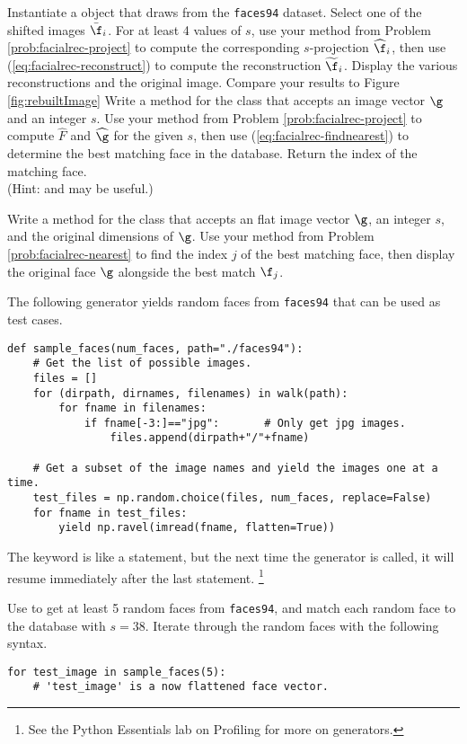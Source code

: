 Instantiate a  object that draws from the \texttt{faces94} dataset.
Select one of the shifted images $\bar{\f}_i$.
For at least 4 values of $s$, use your method from Problem \ref{prob:facialrec-project} to compute the corresponding $s$-projection $\widehat{\f}_i$, then use (\ref{eq:facialrec-reconstruct}) to compute the reconstruction $\widetilde{\f}_i$.
Display the various reconstructions and the original image.
Compare your results to Figure \ref{fig:rebuiltImage}
Write a method for the  class that accepts an image vector $\g$ and an integer $s$.
Use your method from Problem \ref{prob:facialrec-project} to compute $\widehat{F}$ and $\widehat{\g}$ for the given $s$, then use (\ref{eq:facialrec-findnearest}) to determine the best matching face in the database.
Return the index of the matching face.
\\(Hint:  and  may be useful.)
\label{prob:facialrec-nearest}

Write a method for the  class that accepts an flat image vector $\g$, an integer $s$, and the original dimensions of $\g$.
Use your method from Problem \ref{prob:facialrec-nearest} to find the index $j$ of the best matching face, then display the original face $\g$ alongside the best match $\f_j$.

The following generator yields random faces from \texttt{faces94} that can be used as test cases.
%
\begin{lstlisting}
def sample_faces(num_faces, path="./faces94"):
    # Get the list of possible images.
    files = []
    for (dirpath, dirnames, filenames) in walk(path):
        for fname in filenames:
            if fname[-3:]=="jpg":       # Only get jpg images.
                files.append(dirpath+"/"+fname)

    # Get a subset of the image names and yield the images one at a time.
    test_files = np.random.choice(files, num_faces, replace=False)
    for fname in test_files:
        yield np.ravel(imread(fname, flatten=True))
\end{lstlisting}
%
The  keyword is like a  statement, but the next time the generator is called, it will resume immediately after the last  statement.%
\footnote{See the Python Essentials lab on Profiling for more on generators.}

Use  to get at least 5 random faces from \texttt{faces94}, and match each random face to the database with $s=38$.
Iterate through the random faces with the following syntax.
%
\begin{lstlisting}
for test_image in sample_faces(5):
    # 'test_image' is a now flattened face vector.
\end{lstlisting}
\label{prob:facialrec-match}

